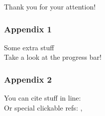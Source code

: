 \documentclass[mathserif, fleqn]{beamer}
\begin{document}
%         

\begin{frame}[plain,c]
  \renewcommand*\item{\olditem[]}
  \begin{center}
    \textcolor{aiphired}{\LARGE Thank you for your attention!}
  \end{center}
\end{frame}

\appendix
\backupbegin

\begin{frame}\frametitle{Appendix 1}
  Some extra stuff\\[2ex]
  Take a look at the progress bar!
\end{frame}

\begin{frame}\frametitle{Appendix 2}
  You can cite stuff in line: \\
  Or special clickable refs: , 
\end{frame}

\backupend
\end{document}
